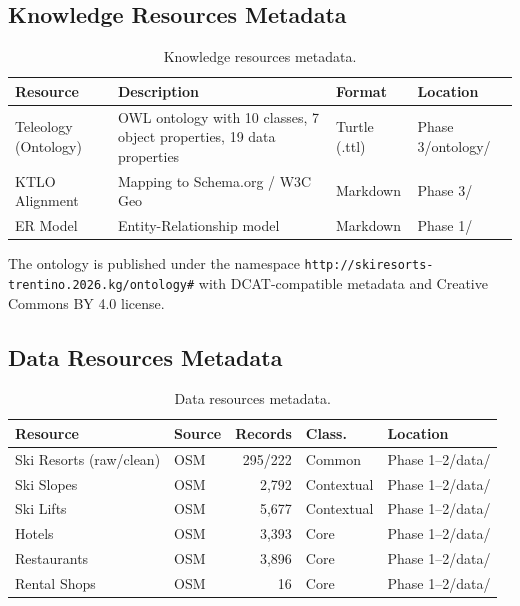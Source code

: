 \subsection{Knowledge Resources Metadata}

\begin{table}[h!]
\centering
\small
\begin{tabular}{|l|p{5cm}|l|l|}
\hline
\textbf{Resource} & \textbf{Description} & \textbf{Format} & \textbf{Location} \\
\hline
Teleology (Ontology) & OWL ontology with 10 classes, 7 object properties, 19 data properties & Turtle (.ttl) & Phase 3/ontology/ \\
KTLO Alignment & Mapping to Schema.org / W3C Geo & Markdown & Phase 3/ \\
ER Model & Entity-Relationship model & Markdown & Phase 1/ \\
\hline
\end{tabular}
\caption{Knowledge resources metadata.}
\end{table}

\noindent The ontology is published under the namespace \texttt{http://skiresorts-trentino.2026.kg/ontology\#} with DCAT-compatible metadata and Creative Commons BY 4.0 license.

\subsection{Data Resources Metadata}

\begin{table}[h!]
\centering
\small
\begin{tabular}{|l|l|r|l|l|}
\hline
\textbf{Resource} & \textbf{Source} & \textbf{Records} & \textbf{Class.} & \textbf{Location} \\
\hline
Ski Resorts (raw/clean) & OSM & 295/222 & Common & Phase 1--2/data/ \\
Ski Slopes & OSM & 2,792 & Contextual & Phase 1--2/data/ \\
Ski Lifts & OSM & 5,677 & Contextual & Phase 1--2/data/ \\
Hotels & OSM & 3,393 & Core & Phase 1--2/data/ \\
Restaurants & OSM & 3,896 & Core & Phase 1--2/data/ \\
Rental Shops & OSM & 16 & Core & Phase 1--2/data/ \\
\hline
\end{tabular}
\caption{Data resources metadata.}
\end{table}

